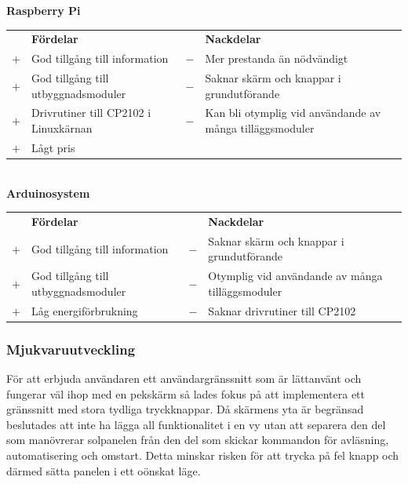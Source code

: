 \documentclass{article}
\begin{document}
                
            \noindent\textsf{\textbf{Raspberry Pi}}\\
            \begin{tabularx}{\textwidth}{@{}cXcX}
                & \textbf{Fördelar}     & & \textbf{Nackdelar} \\
                $+$ & God tillgång till information & 
                                        $-$ & Mer prestanda än nödvändigt \\
                $+$ & God tillgång till utbyggnads\-moduler & 
                                        $-$ & Saknar skärm och knappar i 
                                              grundutförande \\
                $+$ & Drivrutiner till CP2102 i Linuxkärnan &
                                        $-$ & Kan bli otymplig vid användande av   
                                              många tilläggsmoduler \\   
                $+$ & Lågt pris \\   
            \end{tabularx}\\
            
            \noindent\textsf{\textbf{Arduinosystem}} \\ 
            \begin{tabularx}{\textwidth}{@{}cXcX} 
                & \textbf{Fördelar}     & & \textbf{Nackdelar} \\
                $+$ & God tillgång till information & 
                                        $-$ & Saknar skärm och knappar i 
                                            grundutförande \\
                $+$ & God tillgång till utbyggnads\-moduler & 
                                        $-$ & Otymplig vid användande av   
                                            många tilläggsmoduler \\
                $+$ & Låg energiförbrukning &
                                        $-$ & Saknar drivrutiner till CP2102 \\

            \end{tabularx}

            \subsubsection{Mjukvaruutveckling} %
            \label{subsub:mjukvaruutveckling}
            För att erbjuda användaren ett användargränssnitt som är lättanvänt och fungerar väl ihop med en pekskärm så lades fokus på att implementera ett gränssnitt med stora tydliga tryckknappar. Då skärmens yta är begränsad beslutades att inte ha lägga all funktionalitet i en vy utan att separera den del som manövrerar solpanelen från den del som skickar kommandon för avläsning, automatisering och omstart. Detta minskar risken för att trycka på fel knapp och därmed sätta panelen i ett oönskat läge.\\
\end{document}
